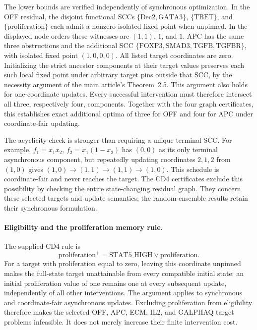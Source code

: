 The lower bounds are verified independently of synchronous optimization.
In the OFF residual, the disjoint functional SCCs
$\{\mathrm{Dec2},\mathrm{GATA3}\}$, $\{\mathrm{TBET}\}$, and
$\{\mathrm{proliferation}\}$ each admit a nonzero isolated fixed point
when unpinned. In the displayed node orders these witnesses are $(1,1)$,
$1$, and $1$. APC has the same three obstructions and the additional SCC
$\{\mathrm{FOXP3},\mathrm{SMAD3},\mathrm{TGFB},\mathrm{TGFBR}\}$,
with isolated fixed point $(1,0,0,0)$. All listed target coordinates are
zero. Initializing the strict ancestor components at their target values
preserves each such local fixed point under arbitrary target pins outside
that SCC, by the necessity argument of
the main article's Theorem~2.5. This argument also holds for
one-coordinate updates. Every successful intervention must therefore
intersect all three, respectively four, components. Together with the
four graph certificates, this establishes exact additional optima of
three for OFF and four for APC under coordinate-fair updating.

The acyclicity check is stronger than requiring a unique terminal SCC.
For example, $f_1=x_1x_2$, $f_2=x_1(1-x_2)$ has $(0,0)$ as its only
terminal asynchronous component, but repeatedly updating coordinates
$2,1,2$ from $(1,0)$ gives
$(1,0)\to(1,1)\to(1,1)\to(1,0)$.
This schedule is coordinate-fair and never reaches the target.
The CD4 certificates exclude this possibility by checking the entire
state-changing residual graph. They concern these selected targets and
update semantics; the random-ensemble results retain their synchronous
formulation.

\paragraph{Eligibility and the proliferation memory rule.}
The supplied CD4 rule is
\[
\mathrm{proliferation}^{+}
=\mathrm{STAT5\_HIGH}\vee\mathrm{proliferation}.
\]
For a target with proliferation equal to zero, leaving this coordinate
unpinned makes the full-state target unattainable from every compatible
initial state: an initial proliferation value of one remains one at
every subsequent update, independently of all other interventions.
The argument applies to synchronous and coordinate-fair asynchronous
updates. Excluding proliferation from eligibility therefore makes the
selected OFF, APC, ECM, IL2, and GALPHAQ target problems infeasible.
It does not merely increase their finite intervention cost.

